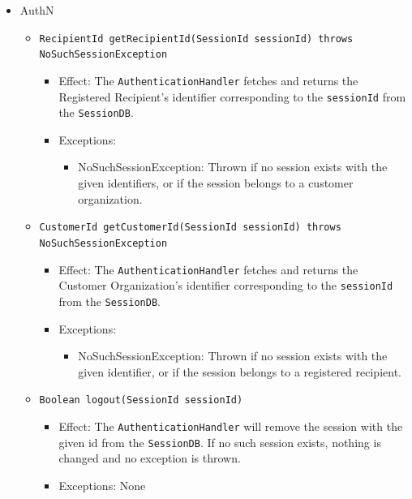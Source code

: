 \documentclass[a4paper,10pt]{article}
\begin{document}
\begin{itemize}
    \item AuthN
    \begin{itemize}
        \item \texttt{RecipientId getRecipientId(SessionId sessionId) throws NoSuchSessionException}
        \begin{itemize}
            \item Effect: The \texttt{AuthenticationHandler} fetches and returns the Registered Recipient's identifier corresponding to the \texttt{sessionId} from the \texttt{SessionDB}.
            \item Exceptions:
            \begin{itemize}
                \item NoSuchSessionException: Thrown if no session exists with the given identifiers, or if the session belongs to a customer organization.
            \end{itemize}
		\end{itemize}
		
        \item \texttt{CustomerId getCustomerId(SessionId sessionId) throws NoSuchSessionException}
        \begin{itemize}
             \item Effect: The \texttt{AuthenticationHandler} fetches and returns the Customer Organization's identifier corresponding to the \texttt{sessionId} from the \texttt{SessionDB}.
             \item Exceptions:
             \begin{itemize}
                \item NoSuchSessionException: Thrown if no session exists with the given identifier, or if the session belongs to a registered recipient.
             \end{itemize}
        \end{itemize}
        
        \item \texttt{Boolean logout(SessionId sessionId)}
        \begin{itemize}
            \item Effect: The \texttt{AuthenticationHandler} will remove the session with the given id from the \texttt{SessionDB}. If no such session exists, nothing is changed and no exception is thrown.
            \item Exceptions: None
        \end{itemize}
        

\end{itemize}
\end{itemize}
\end{document}

